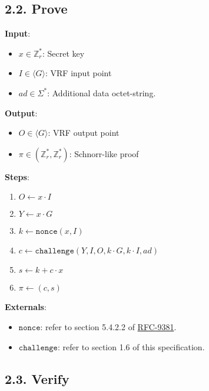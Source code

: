 \documentclass[
]{article}
\providecommand{\tightlist}{%
  \setlength{\itemsep}{0pt}\setlength{\parskip}{0pt}}
\begin{document}
\subsection{2.2. Prove}\label{prove}

\textbf{Input}:

\begin{itemize}
\tightlist
\item
  \(x \in \mathbb{Z}^*_r\): Secret key
\item
  \(I \in \langle G \rangle\): VRF input point
\item
  \(ad \in \Sigma^*\): Additional data octet-string.
\end{itemize}

\textbf{Output}:

\begin{itemize}
\tightlist
\item
  \(O \in \langle G \rangle\): VRF output point
\item
  \(\pi \in (\mathbb{Z}^*_r, \mathbb{Z}^*_r)\): Schnorr-like proof
\end{itemize}

\textbf{Steps}:

\begin{enumerate}
\def\labelenumi{\arabic{enumi}.}
\tightlist
\item
  \(O \gets x \cdot I\)
\item
  \(Y \gets x \cdot G\)
\item
  \(k \gets \texttt{nonce}(x, I)\)
\item
  \(c \gets \texttt{challenge}(Y, I, O, k \cdot G, k \cdot I, ad)\)
\item
  \(s \gets k + c \cdot x\)
\item
  \(\pi \gets (c, s)\)
\end{enumerate}

\textbf{Externals}:

\begin{itemize}
\tightlist
\item
  \(\texttt{nonce}\): refer to section 5.4.2.2 of
  \href{https://datatracker.ietf.org/doc/rfc9381}{RFC-9381}.
\item
  \(\texttt{challenge}\): refer to section 1.6 of this specification.
\end{itemize}

\subsection{2.3. Verify}\label{verify}
\end{document}
